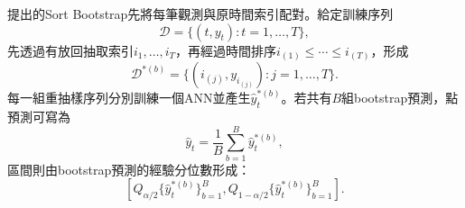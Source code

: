 \cite{lin2024thesis}提出的Sort Bootstrap先將每筆觀測與原時間索引配對。給定訓練序列
\begin{equation}
 \mathcal D=\{(t,y_t):t=1,\ldots,T\},
\end{equation}
先透過有放回抽取索引$i_1,\ldots,i_T$，再經過時間排序$i_{(1)}\le\cdots\le i_{(T)}$，形成
\begin{equation}
 \mathcal D^{*(b)}
 =\{(i_{(j)},y_{i_{(j)}}):j=1,\ldots,T\}.
\end{equation}
每一組重抽樣序列分別訓練一個ANN並產生$\widehat y_t^{*(b)}$。若共有$B$組bootstrap預測，點預測可寫為
\begin{equation}
 \widehat y_t=\frac{1}{B}\sum_{b=1}^{B}\widehat y_t^{*(b)},
\end{equation}
區間則由bootstrap預測的經驗分位數形成：
\begin{equation}
 \left[
 Q_{\alpha/2}\{\widehat y_t^{*(b)}\}_{b=1}^{B},
 Q_{1-\alpha/2}\{\widehat y_t^{*(b)}\}_{b=1}^{B}
 \right].
\end{equation}
